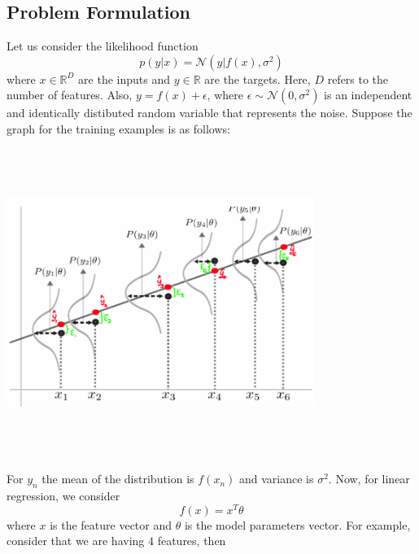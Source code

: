 \documentclass[12pt]{article}
\numberwithin{equation}{section}
\begin{document}
\subsection{Problem Formulation}
Let us consider the likelihood function
\begin{equation*}
	p(y|x)= \mathcal{N}(y|f(x),\sigma^2)
\end{equation*}
where $x \in \mathbb{R}^D$ are the inputs and $y \in \mathbb{R}$ are the targets. Here, $D$ refers to the number of features. Also, $y= f(x) + \epsilon$, where $\epsilon \sim \mathcal{N}(0,\sigma^2)$ is an independent and identically distibuted random variable that represents the noise. Suppose the graph for the training examples is as follows:
\begin{center}
	\includegraphics[width=10cm, height=10cm]{graph3}
\end{center}
For $y_{n}$ the mean of the distribution is $f(x_{n})$ and variance is $\sigma^2$. Now, for linear regression, we consider
\begin{equation*}
	f(x)=x^T\theta
\end{equation*}
where $x$ is the feature vector and $\theta$ is the model parameters vector. For example, consider that we are having $4$ features, then
\end{document}
